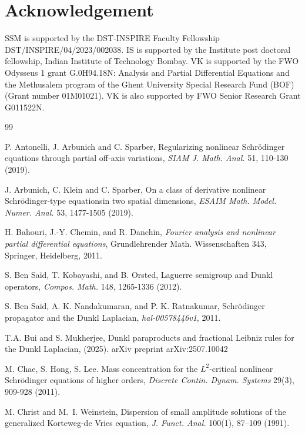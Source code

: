 \documentclass[a4paper,11pt, reqno]{amsart}
\theoremstyle{definition}
\theoremstyle{remark}
\numberwithin{equation}{section}
\begin{document}
	
	
 	
	


	
	\section*{Acknowledgement}
	SSM is supported by the DST-INSPIRE Faculty Fellowship DST/INSPIRE/04/2023/002038.   IS is supported by the Institute post doctoral fellowship, Indian Institute of Technology Bombay.    VK is supported by the FWO Odysseus 1 grant G.0H94.18N: Analysis and Partial Differential Equations and the Methusalem program of the Ghent University Special Research Fund (BOF) (Grant number 01M01021). VK is also supported by FWO Senior Research Grant G011522N. 
	\begin{thebibliography}{99}
		\baselineskip=17pt

         P. Antonelli, J. Arbunich and C. Sparber, Regularizing nonlinear Schr\"odinger equations through partial off-axis variations, \emph{SIAM J. Math. Anal.} 51, 110-130 (2019).  

         J. Arbunich, C. Klein and  C. Sparber, On a class of derivative nonlinear Schr\"odinger-type equationsin two spatial dimensions, \emph{ESAIM Math. Model. Numer. Anal.} 53, 1477-1505 (2019).

         H. Bahouri, J.-Y. Chemin,  and R. Danchin, \emph{Fourier analysis and nonlinear partial differential equations},  Grundlehrender Math. Wissenschaften 343, Springer, Heidelberg, 2011.

         S. Ben Sa\"id, T. Kobayashi, and B. Orsted, {Laguerre semigroup and Dunkl operators}, \emph{Compos. Math.} {148}, 1265-1336 (2012). 

          S. Ben Sa\"id, A. K. Nandakumaran, and  P. K. Ratnakumar, {Schr\"odinger propagator and the Dunkl Laplacian}, \emph{hal-00578446v1}, 2011.

         T.A. Bui and S. Mukherjee, Dunkl paraproducts and fractional Leibniz rules for the Dunkl Laplacian, (2025). arXiv preprint arXiv:2507.10042 

         M. Chae, S. Hong, S. Lee. Mass concentration for the $L^2$-critical nonlinear Schr\"odinger equations of higher orders, \emph{Discrete Contin. Dynam. Systems} 29(3), 909-928 (2011). 

         M. Christ and M.~I. Weinstein, Dispersion of small amplitude solutions of the generalized Korteweg-de Vries equation, \emph{J. Funct. Anal.} 100(1), 87--109 (1991).


\end{thebibliography}
\end{document}

